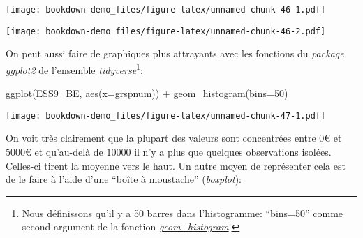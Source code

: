 \documentclass[
]{book}
\newenvironment{Shaded}{\begin{snugshade}}{\end{snugshade}}
\newcommand{\AttributeTok}[1]{\textcolor[rgb]{0.77,0.63,0.00}{#1}}
\newcommand{\DecValTok}[1]{\textcolor[rgb]{0.00,0.00,0.81}{#1}}
\newcommand{\FunctionTok}[1]{\textcolor[rgb]{0.00,0.00,0.00}{#1}}
\newcommand{\NormalTok}[1]{#1}
\newcommand{\SpecialCharTok}[1]{\textcolor[rgb]{0.00,0.00,0.00}{#1}}
\begin{document}
\begin{Shaded}
\end{Shaded}

\texttt{[image: bookdown-demo\_files/figure-latex/unnamed-chunk-46-1.pdf]}

\begin{Shaded}
\end{Shaded}

\texttt{[image: bookdown-demo\_files/figure-latex/unnamed-chunk-46-2.pdf]}

On peut aussi faire de graphiques plus attrayants avec les fonctions du \emph{package} \href{https://ggplot2.tidyverse.org/}{\emph{ggplot2}} de l'ensemble \href{https://www.tidyverse.org/}{\emph{tidyverse}}\footnote{Nous définissons qu'il y a 50 barres dans l'histogramme: ``bins=50'' comme second argument de la fonction \href{https://ggplot2.tidyverse.org/reference/geom_histogram.html}{\emph{geom\_histogram}}.}:

\begin{Shaded}
\begin{Highlighting}[]
\FunctionTok{ggplot}\NormalTok{(ESS9\_BE, }\FunctionTok{aes}\NormalTok{(}\AttributeTok{x=}\NormalTok{grspnum)) }\SpecialCharTok{+}
  \FunctionTok{geom\_histogram}\NormalTok{(}\AttributeTok{bins=}\DecValTok{50}\NormalTok{)}
\end{Highlighting}
\end{Shaded}

\texttt{[image: bookdown-demo\_files/figure-latex/unnamed-chunk-47-1.pdf]}

On voit très clairement que la plupart des valeurs sont concentrées entre \(0€\) et \(5000€\) et qu'au-delà de \(10000\) il n'y a plus que quelques observations isolées. Celles-ci tirent la moyenne vers le haut. Un autre moyen de représenter cela est de le faire à l'aide d'une ``boîte à moustache'' (\emph{boxplot}):

\begin{Shaded}
\end{Shaded}
\end{document}
